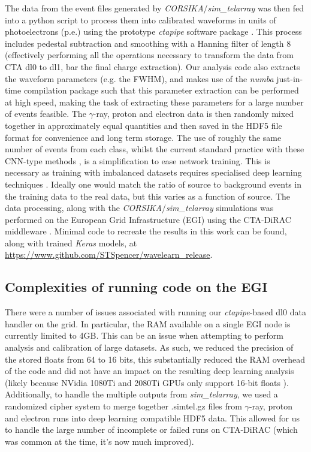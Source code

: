 The data from the event files generated by \textit{CORSIKA}/\textit{sim\_telarray} was then fed into a python script to process them into calibrated waveforms in units of photoelectrons (p.e.) using the prototype \textit{ctapipe} software package \cite{ctapipe,ctapipe2}. This process includes pedestal subtraction and smoothing with a Hanning filter \cite{hanning} of length 8 (effectively performing all the operations necessary to transform the data from CTA dl0 to dl1, bar the final charge extraction). Our analysis code also extracts the waveform parameters (e.g. the FWHM), and makes use of the \textit{numba} \cite{numba} just-in-time compilation package such that this parameter extraction can be performed at high speed, making the task of extracting these parameters for a large number of events feasible. The $\gamma$-ray, proton and electron data is then randomly mixed together in approximately equal quantities and then saved in the HDF5 \cite{hdf} file format for convenience and long term storage. The use of roughly the same number of events from each class, whilst the current standard practice with these CNN-type methods \cite{Shilon}, is a simplification to ease network training. This is necessary as training with imbalanced datasets requires specialised deep learning techniques \cite{imbalance}. Ideally one would match the ratio of source to background events in the training data to the real data, but this varies as a function of source. The data processing, along with the \textit{CORSIKA}/\textit{sim\_telarray} simulations was performed on the European Grid Infrastructure (EGI) using the CTA-DiRAC middleware \cite{luisa}. Minimal code to recreate the results in this work can be found, along with trained \textit{Keras} models, at \url{https://www.github.com/STSpencer/wavelearn\_release}.

\subsection{Complexities of running code on the EGI}

There were a number of issues associated with running our \textit{ctapipe}-based dl0 data handler on the grid. In particular, the RAM available on a single EGI node is currently limited to 4GB. This can be an issue when attempting to perform analysis and calibration of large datasets. As such, we reduced the precision of the stored floats from 64 to 16 bits, this substantially reduced the RAM overhead of the code and did not have an impact on the resulting deep learning analysis (likely because NVidia 1080Ti and 2080Ti GPUs only support 16-bit floats \cite{2080ti}). Additionally, to handle the multiple outputs from \textit{sim\_telarray}, we used a randomized cipher system to merge together .simtel.gz files from $\gamma$-ray, proton and electron runs into deep learning compatible HDF5 data. This allowed for us to handle the large number of incomplete or failed runs on CTA-DiRAC (which was common at the time, it's now much improved).

